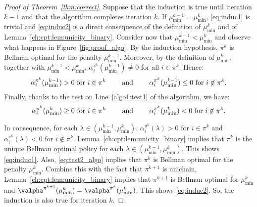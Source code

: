 \begin{proof}[Proof of Theorem~\ref{thm:correct}]
    Suppose that the induction is true until iteration $k-1$ and that the algorithm completes iteration $k$.
    If $\mu^{k-1}_{\min}=\mu^k_{\min}$, \ref{eq:induc1} is trivial and \ref{eq:induc2} is a direct consequence of the definition of $\mu^k_{\min}$ and of Lemma~\ref{ch:cpt:lem:unicity_binary}.
    Consider now that $\mu^{k-1}_{\min}<\mu^k_{\min}$ and observe what happens in Figure~\ref{fig:proof_algo}.
    By the induction hypothesis, $\pi^k$ is Bellman optimal for the penalty $\mu^{k-1}_{\min}$.
    Moreover, by the definition of $\mu^k_{\min}$, together with $\mu^{k-1}_{\min}<\mu^k_{\min}$, $\alpha^{\pi^k}_i(\mu^{k-1}_{\min})\ne0$ for all $i\in\pi^k$. Hence:
    \begin{align*}
        \alpha^{\pi^{k}}_i(\mu^{k-1}_{\min})>0 \text{ for $i\in\pi^k$ \qquad and \qquad } \alpha^{\pi^{k}}_i(\mu^{k-1}_{\min})\le0\text{ for $i\not\in\pi^k$}.
    \end{align*}
    Finally, thanks to the test on Line~\ref{algo1:test1} of the algorithm, we have:
    \begin{align}
        \label{eq:test2_algo}
        \alpha^{\pi^{k}}_i(\mu^{k}_{\min})\ge0 \text{ for $i\in\pi^k$ \qquad and \qquad } \alpha^{\pi^{k}}_i(\mu^{k}_{\min})<0\text{ for $i\not\in\pi^k$}.
    \end{align}

    In consequence, for each $\lambda\in(\mu^{k-1}_{\min}, \mu^{k}_{\min})$, $\alpha^{\pi^{k}}_i(\lambda) >0$ for $i\in\pi^{k}$ and $\alpha^{\pi^{k}}_i(\lambda) <0$ for $i\notin\pi^{k}$. Lemma~\ref{ch:cpt:lem:unicity_binary} implies that $\pi^{k}$ is the unique Bellman optimal policy for each $\lambda\in(\mu^{k-1}_{\min}, \mu^{k}_{\min})$. 
    This shows \ref{eq:induc1}.
    Also, \eqref{eq:test2_algo} implies that $\pi^{k}$ is Bellman optimal for the penalty $\mu^{k}_{\min}$.
    Combine this with the fact that $\pi^{k+1}$ is unichain, Lemma~\ref{ch:cpt:lem:unicity_binary} implies that $\pi^{k+1}$ is Bellman optimal for $\mu^{k}_{\min}$ and $\valpha^{\pi^{k+1}}(\mu^{k}_{\min}) =\valpha^{\pi^{k}}(\mu^{k}_{\min})$.
    This shows \ref{eq:induc2}.
    So, the induction is also true for iteration $k$.


\end{proof}
